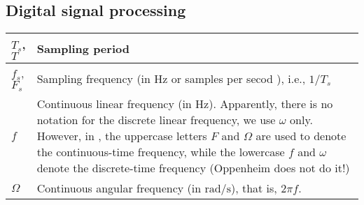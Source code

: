 \subsection{Digital signal processing}
\begin{xltabular}{\textwidth}{XX}
	\(T_s\)\cite{ingleDigitalSignalProcessing2000}, \(T\)\cite{oppenheimDiscreteTimeSignalProcessing2009} & Sampling period                                                                                                                                                                                                                                                                                                                                                                                                                                          \\ \hline
	\(f_s\), \(F_s\)\cite{ingleDigitalSignalProcessing2000}                                               & Sampling frequency (in \(\si{\hertz}\) or samples per secod \cite[chapter 3]{ingleDigitalSignalProcessing2000}), i.e., \(1/T_s\)                                                                                                                                                                                                                                                                                                                         \\ \hline
	\(f\)                                                                                                 & Continuous linear frequency (in \(\si{\hertz}\)). Apparently, there is no notation for the discrete linear frequency, we use \(\omega\) only. However, in \cite{ingleDigitalSignalProcessing2000}, the uppercase letters \(F\) and \(\Omega\) are used to denote the continuous-time frequency, while the lowercase \(f\) and \(\omega\) denote the discrete-time frequency (Oppenheim \cite{oppenheimDiscreteTimeSignalProcessing2009} does not do it!) \\ \hline
	\(\Omega\) \cite{ingleDigitalSignalProcessing2000}                                                    & Continuous angular frequency (in \(\si{\radian\per\second}\)), that is, \(2\pi f\).                                                                                                                                                                                                                                                                                                                                                                      \\ \hline

\end{xltabular}
